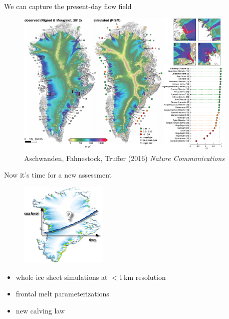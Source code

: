 \documentclass[hide notes,intlimits]{beamer}
\begin{document}
\begin{frame}{We can capture the present-day flow field}
  \begin{figure}
    \includegraphics[height=7cm]{greenland-overview-3}
    \\ \scriptsize{Aschwanden, Fahnestock, Truffer (2016) \textit{Nature Communications}}
  \end{figure}
\end{frame}

\begin{frame}{Now it's time for a new assessment}
  \begin{figure}
    \includegraphics[height=4cm]{grn1km_speed_slr}
  \end{figure}
  \begin{itemize}
  \item whole ice sheet simulations at $<$1\,km resolution
  \item frontal melt parameterizations
  \item new calving law
  \end{itemize}
\end{frame}
\end{document}
